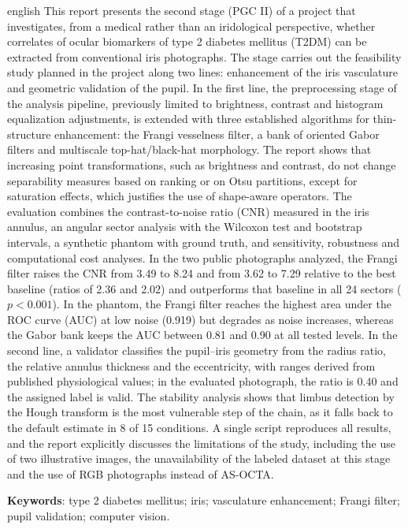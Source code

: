 \documentclass[12pt, oneside, a4paper, chapter=TITLE, section=TITLE,
               english, brazil]{abntex2}
\begin{document}
\begin{resumo}[Abstract]
\begin{otherlanguage*}{english}
This report presents the second stage (PGC II) of a project that
investigates, from a medical rather than an iridological perspective, whether
correlates of ocular biomarkers of type 2 diabetes mellitus (T2DM) can be
extracted from conventional iris photographs. The stage carries out the
feasibility study planned in the project along two lines: enhancement of the
iris vasculature and geometric validation of the pupil. In the first line, the
preprocessing stage of the analysis pipeline, previously limited to
brightness, contrast and histogram equalization adjustments, is extended with
three established algorithms for thin-structure enhancement: the Frangi
vesselness filter, a bank of oriented Gabor filters and multiscale
top-hat/black-hat morphology. The report shows that increasing point
transformations, such as brightness and contrast, do not change separability
measures based on ranking or on Otsu partitions, except for saturation
effects, which justifies the use of shape-aware operators. The evaluation
combines the contrast-to-noise ratio (CNR) measured in the iris annulus, an
angular sector analysis with the Wilcoxon test and bootstrap intervals, a
synthetic phantom with ground truth, and sensitivity, robustness and
computational cost analyses. In the two public photographs analyzed, the
Frangi filter raises the CNR from 3.49 to 8.24 and from 3.62 to 7.29 relative
to the best baseline (ratios of 2.36 and 2.02) and outperforms that baseline
in all 24 sectors ($p<0.001$). In the phantom, the Frangi filter reaches the
highest area under the ROC curve (AUC) at low noise (0.919) but degrades as
noise increases, whereas the Gabor bank keeps the AUC between 0.81 and 0.90
at all tested levels. In the second line, a validator classifies the
pupil--iris geometry from the radius ratio, the relative annulus thickness
and the eccentricity, with ranges derived from published physiological
values; in the evaluated photograph, the ratio is 0.40 and the assigned label
is valid. The stability analysis shows that limbus detection by the Hough
transform is the most vulnerable step of the chain, as it falls back to the
default estimate in 8 of 15 conditions. A single script reproduces all
results, and the report explicitly discusses the limitations of the study,
including the use of two illustrative images, the unavailability of the
labeled dataset at this stage and the use of RGB photographs instead of
AS-OCTA.

\vspace{\onelineskip}
\noindent\textbf{Keywords}: type 2 diabetes mellitus; iris; vasculature
enhancement; Frangi filter; pupil validation; computer vision.
\end{otherlanguage*}
\end{resumo}
\end{document}
